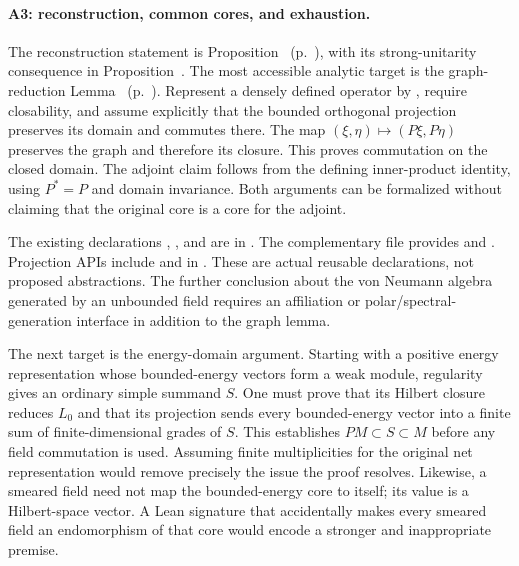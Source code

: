 \paragraph{A3: reconstruction, common cores, and exhaustion.}
The reconstruction statement is
Proposition~
(p.~), with its strong-unitarity
consequence in Proposition~.
The most accessible analytic target is the graph-reduction
Lemma~
(p.~).
Represent a densely defined operator by , require
closability, and assume explicitly that the bounded orthogonal
projection preserves its domain and commutes there. The map
$(\xi,\eta)\mapsto(P\xi,P\eta)$ preserves the graph and therefore its
closure. This proves commutation on the closed domain. The adjoint
claim follows from the defining inner-product identity, using
$P^*=P$ and domain invariance. Both arguments can be formalized without
claiming that the original core is a core for the adjoint.

The existing declarations
,
, and
 are in
.
The complementary file
 provides
 and
.
Projection APIs include 
and  in
.
These are actual reusable declarations, not proposed abstractions.
The further conclusion about the von Neumann algebra generated by an
unbounded field requires an affiliation or polar/spectral-generation
interface in addition to the graph lemma.

The next target is the energy-domain argument. Starting with a positive
energy representation whose bounded-energy vectors form a weak module,
regularity gives an ordinary simple summand $S$. One must prove that
its Hilbert closure reduces $L_0$ and that its projection sends every
bounded-energy vector into a finite sum of finite-dimensional grades
of $S$. This establishes $PM\subset S\subset M$ before any field
commutation is used. Assuming finite multiplicities for the original
net representation would remove precisely the issue the proof resolves.
Likewise, a smeared field need not map the bounded-energy core to
itself; its value is a Hilbert-space vector. A Lean signature that
accidentally makes every smeared field an endomorphism of that core
would encode a stronger and inappropriate premise.


